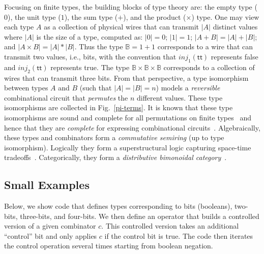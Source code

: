 \documentclass[sigplan,10pt,review,anonymous]{acmart}
\newcommand{\inlv}[1]{\ensuremath{\mathit{inj}_1(#1)}}
\newcommand{\inrv}[1]{\ensuremath{\mathit{inj}_2(#1)}}
\begin{document}
Focusing on finite types, the building blocks of type theory are: the
empty type ($0$), the unit type ($1$), the sum type ($+$), and the
product ($\times$) type. One may view each type $A$ as a collection of
physical wires that can transmit $|A|$ distinct values where $|A|$ is
the size of a type, computed as: $| 0 | = 0$; $| 1 | = 1$;
$| A + B | = | A | + | B |$; and $| A \times B | = | A | * | B
|$. Thus the type $\mathbb{B} = 1 + 1$ corresponds to a wire that can
transmit two values, i.e., bits, with the convention that $\inlv{\textsf{tt}}$
represents \textsf{false} and $\inrv{\textsf{tt}}$ represents
\textsf{true}. The type
$\mathbb{B} \times \mathbb{B} \times \mathbb{B}$ corresponds to a
collection of wires that can transmit three bits. From that
perspective, a type isomorphism between types $A$ and $B$ (such that
$|A|=|B|=n$) models a \emph{reversible} combinational circuit that
\emph{permutes} the $n$ different values. These type isomorphisms are
collected in Fig.~\ref{pi-terms}. It is known that these type
isomorphisms are sound and complete for all permutations on finite
types~\cite{Fiore:2004,fiore-remarks} and hence that they are
\emph{complete} for expressing combinational
circuits~\cite{fredkin1982conservative,James:2012:IE:2103656.2103667,Toffoli:1980}. Algebraically,
these types and combinators form a \emph{commutative semiring} (up to
type isomorphism). Logically they form a superstructural logic
capturing space-time tradeoffs~\cite{superstructural}. Categorically,
they form a \emph{distributive bimonoidal category}~\cite{laplaza72}.


\subsection{Small Examples}
\label{sub:toff}

Below, we show code that defines types corresponding to bits (booleans),
two-bits, three-bits, and four-bits. We then define an operator that
builds a controlled version of a given combinator $c$. This controlled
version takes an additional ``control'' bit and only applies $c$ if
the control bit is true. The code then iterates the control operation
several times starting from boolean negation.

\Bexamples{}
\end{document}
